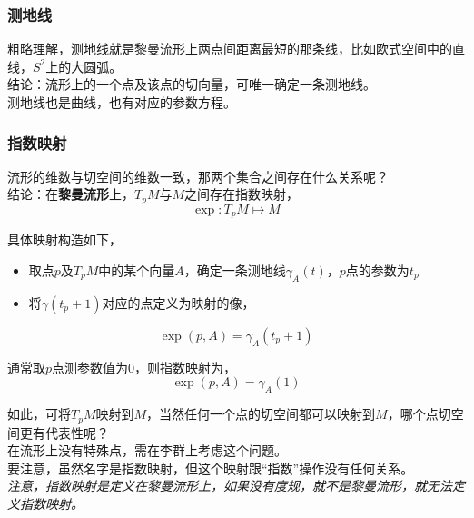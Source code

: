 \subsubsection*{测地线}
粗略理解，测地线就是黎曼流形上两点间距离最短的那条线，比如欧式空间中的直线，$S^2$上的大圆弧。\\

结论：流形上的一个点及该点的切向量，可唯一确定一条测地线。\\

测地线也是曲线，也有对应的参数方程。

\subsubsection*{指数映射}
流形的维数与切空间的维数一致，那两个集合之间存在什么关系呢？\\

结论：在\textbf{黎曼流形}上，$T_pM$与$M$之间存在指数映射，
$$
	\exp:T_pM \mapsto M
$$

具体映射构造如下，
\begin{itemize}
\item 取点$p$及$T_pM$中的某个向量$A$，确定一条测地线$\gamma_A(t)$，$p$点的参数为$t_p$
\item 将$\gamma(t_p+1)$对应的点定义为映射的像，
\end{itemize}

$$
	\exp(p,A) = \gamma_A(t_p+1)
$$

通常取$p$点测参数值为$0$，则指数映射为，
$$
	\exp(p,A) = \gamma_A(1)
$$

如此，可将$T_pM$映射到$M$，当然任何一个点的切空间都可以映射到$M$，哪个点切空间更有代表性呢？\\

在流形上没有特殊点，需在李群上考虑这个问题。\\

要注意，虽然名字是指数映射，但这个映射跟“指数”操作没有任何关系。\\

\textit{注意，指数映射是定义在黎曼流形上，如果没有度规，就不是黎曼流形，就无法定义指数映射。}